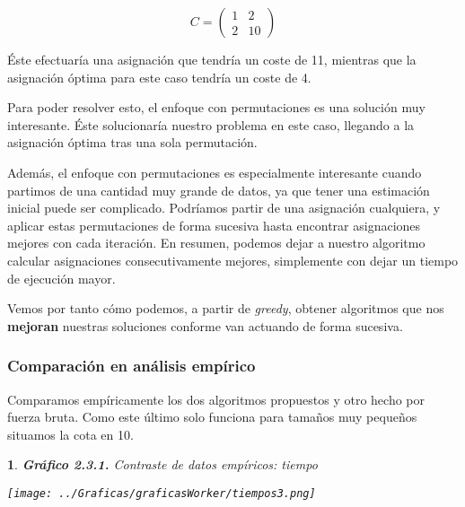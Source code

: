 \documentclass[10pt, a4paper]{article}
\theoremstyle{theorem-style}
\newtheorem*{datos}{}
\theoremstyle{theorem-style}
\theoremstyle{definition-style}
\theoremstyle{remark-style}
\theoremstyle{example-style}
\theoremstyle{definition-style}
\theoremstyle{remark-style}
\begin{document}
$$C=\left(\begin{matrix}1&2\\2&10\end{matrix}\right)$$

Éste efectuaría una asignación que tendría un coste de 11, mientras que la asignación óptima para este caso tendría un coste de 4.

Para poder resolver esto, el enfoque con permutaciones es una solución muy interesante. Éste solucionaría nuestro problema en este caso, llegando a la asignación óptima tras una sola permutación.

Además, el enfoque con permutaciones es especialmente interesante cuando partimos de una cantidad muy grande de datos, ya que tener una estimación inicial puede ser complicado. Podríamos partir de una asignación cualquiera, y aplicar estas permutaciones de forma sucesiva hasta encontrar asignaciones mejores con cada iteración. En resumen, podemos dejar a nuestro algoritmo calcular asignaciones consecutivamente mejores, simplemente con dejar un tiempo de ejecución mayor.

Vemos por tanto cómo podemos, a partir de \emph{greedy}, obtener algoritmos que nos \textbf{mejoran} nuestras soluciones conforme van actuando de forma sucesiva.

\subsubsection*{Comparación en análisis empírico}

Comparamos empíricamente los dos algoritmos propuestos y otro hecho por fuerza bruta. Como este último solo funciona para tamaños muy pequeños situamos la cota en 10.

\pagebreak

\begin{datos}
	{\bf\sffamily Gráfico 2.3.1.} {\sffamily Contraste de datos empíricos: tiempo}\\
	\vspace{-0.7cm}
	\begin{center}
		\texttt{[image: ../Graficas/graficasWorker/tiempos3.png]}
	\end{center}	
\end{datos}
\end{document}
